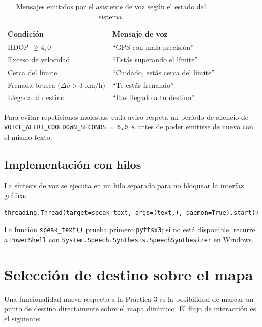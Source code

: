 \documentclass[10pt]{article}
\begin{document}
\begin{table}[H]
\centering
\renewcommand{\arraystretch}{1.2}
\begin{tabular}{@{}ll@{}}
\toprule
\textbf{Condición} & \textbf{Mensaje de voz} \\
\midrule
HDOP $\geq 4{,}0$   & ``GPS con mala precisión'' \\
Exceso de velocidad & ``Estás superando el límite'' \\
Cerca del límite    & ``Cuidado, estás cerca del límite'' \\
Frenada brusca ($\Delta v > 3$ km/h) & ``Te estás frenando'' \\
Llegada al destino  & ``Has llegado a tu destino'' \\
\bottomrule
\end{tabular}
\caption{Mensajes emitidos por el asistente de voz según el estado del sistema.}
\label{tab:voz}
\end{table}

Para evitar repeticiones molestas, cada aviso respeta un período de silencio de \texttt{VOICE\_ALERT\_COOLDOWN\_SECONDS = 6{,}0 s} antes de poder emitirse de nuevo con el mismo texto.

\subsection{Implementación con hilos}

La síntesis de voz se ejecuta en un hilo separado para no bloquear la interfaz gráfica:

\begin{lstlisting}[style=pythonEstilo]
threading.Thread(target=speak_text, args=(text,), daemon=True).start()
\end{lstlisting}

La función \texttt{speak\_text()} prueba primero \texttt{pyttsx3}; si no está disponible, recurre a \texttt{PowerShell} con \texttt{System.Speech.Synthesis.SpeechSynthesizer} en Windows.

\section{Selección de destino sobre el mapa}

Una funcionalidad nueva respecto a la Práctica 3 es la posibilidad de marcar un punto de destino directamente sobre el mapa dinámico. El flujo de interacción es el siguiente:
\end{document}
